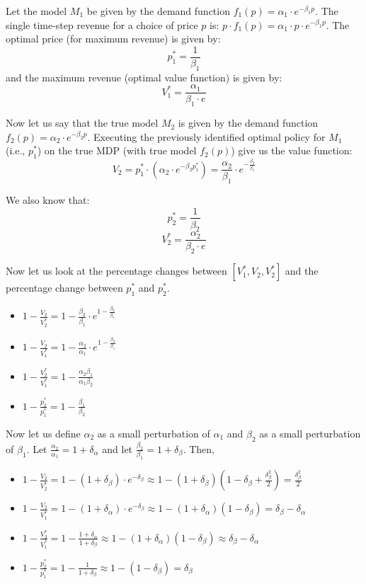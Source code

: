 \documentclass[12pt]{amsart}
\begin{document}
    
    Let the model $M_1$ be given by the demand function $f_1(p) = \alpha_1 \cdot e^{-\beta_1 p}$. The single time-step revenue for a choice of price $p$ is: $p \cdot f_1(p) = \alpha_1 \cdot p \cdot e^{-\beta_1 p}$. The optimal price (for maximum revenue) is given by:
   $$p_1^* = \frac 1 {\beta_1}$$ and the maximum revenue (optimal value function) is given by:
   $$V_1^* = \frac {\alpha_1} {\beta_1 \cdot e}$$
   
   Now let us say that the true model $M_2$ is given by the demand function $f_2(p) = \alpha_2 \cdot e^{-\beta_2 p}$. Executing the previously identified optimal policy for $M_1$ (i.e., $p_1^*$) on the true MDP (with true model $f_2(p)$) give us the value function:
   $$V_2 = p_1^* \cdot (\alpha_2 \cdot e^{- \beta_2 p_1^*}) = \frac {\alpha_2} {\beta_1} \cdot e^{-\frac {\beta_2} {\beta_1} }$$
   
   We also know that:
    $$p_2^* = \frac 1 {\beta_2}$$
    $$V_2^* = \frac {\alpha_2} {\beta_2 \cdot e}$$
    
    Now let us look at the percentage changes between $[V_1^*, V_2, V_2^*]$ and the percentage change between $p_1^*$ and $p_2^*$.

    \begin{itemize}
    \item $1 - \frac {V_2} {V_2^*} = 1 - \frac {\beta_2} {\beta_1} \cdot e^{1 - \frac {\beta_2} {\beta_1}}$
    \item $1 - \frac {V_2} {V_1^*} = 1 - \frac {\alpha_2} {\alpha_1} \cdot e^{1 - \frac {\beta_2} {\beta_1}}$
    \item $1 - \frac {V_2^*} {V_1^*} = 1 - \frac {\alpha_2 \beta_1} {\alpha_1 \beta_2}$
    \item $1 - \frac {p_2^*} {p_1^*} = 1 - \frac {\beta_1} {\beta_2}$
    \end{itemize} 
    
    Now let us define $\alpha_2$ as a small perturbation of $\alpha_1$ and $\beta_2$ as a small perturbation of $\beta_1$.
    Let $\frac {\alpha_2} {\alpha_1} = 1 + \delta_\alpha$ and let $\frac {\beta_2} {\beta_1} =  1 + \delta_\beta$. Then,
    
    \begin{itemize}
    \item $1 - \frac {V_2} {V_2^*} = 1 - (1 + \delta_\beta) \cdot e^{-\delta_\beta} \approx 1 - (1 + \delta_\beta) (1 - \delta_\beta + \frac {\delta_\beta^2} 2) =  \frac {\delta_\beta^2} 2$
    \item $1 - \frac {V_2} {V_1^*} = 1 - (1 + \delta_\alpha) \cdot e^{-\delta_\beta} \approx 1 - (1 + \delta_\alpha) (1 - \delta_\beta) =  \delta_\beta - \delta_\alpha$
    \item $1 - \frac {V_2^*} {V_1^*} = 1 - \frac {1 + \delta_\alpha} {1+\delta_\beta} \approx 1 - (1 + \delta_\alpha)(1 - \delta_\beta)  \approx \delta_\beta - \delta_\alpha$
    \item $1 - \frac {p_2^*} {p_1^*} = 1 - \frac 1 {1 + \delta_\beta} \approx 1 - (1 - \delta_\beta) =  \delta_\beta$
    \end{itemize}
    
   
   
\end{document}
